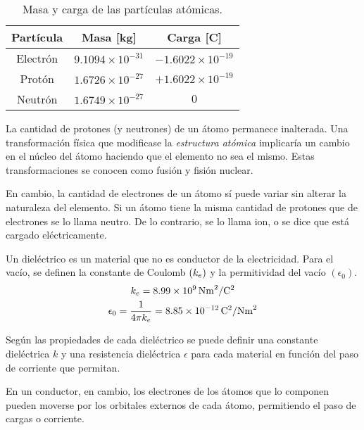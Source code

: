 \documentclass[a5paper,12pt,twoside]{book}
\begin{document}
\begin{table}[h!]
    \begin{center}
        \begin{tabular}{|c|c|c|}
            \hline
            Partícula & Masa [\si{\kilo\gram}] & Carga [\si{\coulomb}]
            \\ \hline \hline
            Electrón & $9.1094 \times 10^{-31}$ & $-1.6022 \times 10^{-19}$
            \\ \hline
            Protón & $1.6726 \times 10^{-27}$ & $+1.6022 \times 10^{-19}$
            \\ \hline
            Neutrón & $1.6749 \times 10^{-27}$ & $0$
            \\ \hline
        \end{tabular}
        \caption{Masa y carga de las partículas atómicas.}
    \end{center}
\end{table}

La cantidad de protones (y neutrones) de un átomo permanece inalterada. Una transformación física que modificase la \emph{estructura atómica} implicaría un cambio en el núcleo del átomo haciendo que el elemento no sea el mismo. Estas transformaciones se conocen como fusión y fisión nuclear.

En cambio, la cantidad de electrones de un átomo sí puede variar sin alterar la naturaleza del elemento. Si un átomo tiene la misma cantidad de protones que de electrones se lo llama neutro. De lo contrario, se lo llama ion, o se dice que está cargado eléctricamente.


Un dieléctrico es un material que no es conductor de la electricidad.
Para el vacío, se definen la constante de Coulomb $(k_e)$ y la permitividad del vacío $(\epsilon_0)$.
\begin{gather*}
    k_e=8.99 \times 10^9\,\si{\newton\metre^2\per\coulomb^2}
    \\
    \epsilon_0 = \dfrac{1}{4 \pi k_e} = 8.85 \times 10^{-12} \,\si{\coulomb^2\per\newton\metre^2}
\end{gather*}

Según las propiedades de cada dieléctrico se puede definir una constante dieléctrica $k$ y una resistencia dieléctrica $\epsilon$ para cada material en función del paso de corriente que permitan.

En un conductor, en cambio, los electrones de los átomos que lo componen pueden moverse por los orbitales externos de cada átomo, permitiendo el paso de cargas o corriente.
\end{document}
